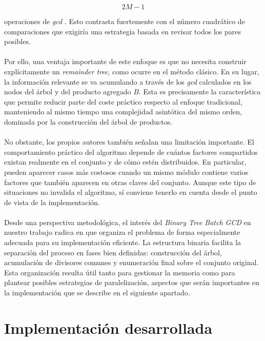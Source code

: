 \[
2M - 1
\]

operaciones de \textit{gcd} \citep{pelofske2024efficient}. Esto contrasta fuertemente con el número cuadrático de comparaciones que exigiría una estrategia basada en revisar todos los pares posibles.
\\
\\
Por ello, una ventaja importante de este enfoque es que no necesita construir explícitamente un \textit{remainder tree}, como ocurre en el método clásico. En su lugar, la información relevante se va acumulando a través de los \textit{gcd} calculados en los nodos del árbol y del producto agregado \(B\). Esta es precisamente la característica que permite reducir parte del coste práctico respecto al enfoque tradicional, manteniendo al mismo tiempo una complejidad asintótica del mismo orden, dominada por la construcción del árbol de productos.
\\
\\
No obstante, los propios autores también señalan una limitación importante. El comportamiento práctico del algoritmo depende de cuántos factores compartidos existan realmente en el conjunto y de cómo estén distribuidos. En particular, pueden aparecer casos más costosos cuando un mismo módulo contiene varios factores que también aparecen en otras claves del conjunto. Aunque este tipo de situaciones no invalida el algoritmo, sí conviene tenerlo en cuenta desde el punto de vista de la implementación.
\\
\\
Desde una perspectiva metodológica, el interés del \textit{Binary Tree Batch GCD} en nuestro trabajo radica en que organiza el problema de forma especialmente adecuada para su implementación eficiente. La estructura binaria facilita la separación del proceso en fases bien definidas: construcción del árbol, acumulación de divisores comunes y enumeración final sobre el conjunto original. Esta organización resulta útil tanto para gestionar la memoria como para plantear posibles estrategias de paralelización, aspectos que serán importantes en la implementación que se describe en el siguiente apartado.

\section{Implementación desarrollada}

